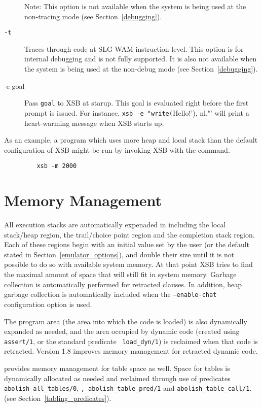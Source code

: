 \begin{description}
    Note: This option is not available when the system is being used
    at the non-tracing mode (see Section~\ref{debugging}).
\item[{\tt -t}] Traces through code at SLG-WAM instruction level.  This
    option is for internal debugging and is not fully supported.
    It is also not available when the system is being used at the non-debug
    mode (see Section~\ref{debugging}).

  \item[-e goal] Pass {\tt goal}  to XSB at starup. This goal is evaluated
    right before the first prompt is issued. For instance, 
    \verb'xsb -e "write('Hello!'), nl."'
    will print a heart-warming message when XSB starts up.
\end{description}

As an example, a program which uses more heap and local stack than the
default configuration of XSB might be run by invoking XSB with the command.
\begin{verbatim}
         xsb -m 2000
\end{verbatim}


\section{Memory Management}\label{memory_management}
All execution stacks are automatically expenaded in \version{}
including the local stack/heap region, the trail/choice point region
and the completion stack region.  Each of these regions begin with an
initial value set by the user (or the default stated in
Section~\ref{emulator_options}), and double their size until it is not
possible to do so with available system memory.  At that point XSB
tries to find the maximal amount of space that will still fit in
system memory.  Garbage collection is automatically performed for
retracted clauses.  In addition, heap garbage collection is
automatically included when the {\tt --enable-chat} configuration
option is used.

The program area (the area into which the code is loaded) is also
dynamically expanded as needed, and the area occupied by dynamic code
(created using {\tt assert/1}, or the standard predicate {\tt
load\_dyn/1}) is reclaimed when that code is retracted.  Version 1.8
improves memory management for retracted dynamic code.

\version{} provides memory management for table space as well.  Space for
tables is dynamically allocated as needed and reclaimed through use of
predicates {\tt abolish\_all\_tables/0}, {\tt, abolish\_table\_pred/1}
and {\tt abolish\_table\_call/1}.  (see
Section~\ref{tabling_predicates}).  


